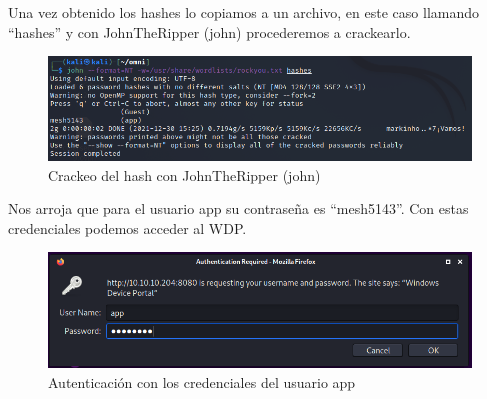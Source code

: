 \documentclass{article}
\begin{document}
Una vez obtenido los hashes lo copiamos a un archivo, en este caso llamando “hashes” y con JohnTheRipper (john) procederemos a crackearlo.
\begin{figure}[H]
	\center
	\includegraphics[width=\textwidth]{images/omni/16.png}
	\caption{Crackeo del hash con JohnTheRipper (john)}
\end{figure}

Nos arroja que para el usuario app su contraseña es “mesh5143”. Con estas credenciales podemos acceder al WDP.
\begin{figure}[H]
	\center
	\includegraphics[width=\textwidth]{images/omni/17.png}
	\caption{Autenticación con los credenciales del usuario app}
\end{figure}
\end{document}
